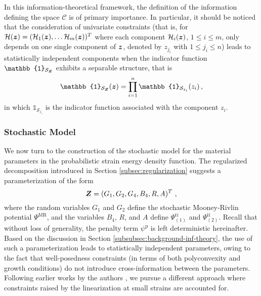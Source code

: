 In this information-theoretical framework, the definition of the information defining the space $\mathcal{C}$ is of primary importance. In particular, it should be noticed that the consideration of univariate constraints (that is, for $\mathcal{H}(\boldsymbol{z}) = (\mathcal{H}_1(\boldsymbol{z}), \ldots \mathcal{H}_m(\boldsymbol{z}))^T$ where each component $\mathcal{H}_i(\boldsymbol{z})$, $1 \leq i \leq m$, only depends on one single component of $\boldsymbol{z}$, denoted by $z_{j_i}$ with $1 \leq j_i \leq n$) leads to statistically independent components when the indicator function $\mathbb{1}_{\mathcal{S}_{\bfZ}}$ exhibits a separable structure, that is
\begin{equation}
    \mathbb{1}_{\mathcal{S}_{\bfZ}}(\bfz) = \prod_{i = 1}^{n} \mathbb{1}_{\mathcal{S}_{z_i}}(z_i)\,,
\end{equation}
in which $\mathbb{1}_{\mathcal{S}_{z_i}}$ is the indicator function associated with the component $z_i$.

\subsubsection{Stochastic Model} \label{Stochastic Model Homogeneous}

We now turn to the construction of the stochastic model for the material parameters in the probabilistic strain energy density function. The regularized decomposition introduced in Section \ref{subsec:regularization} suggests a parameterization of the form
\begin{equation}
    \boldsymbol{Z} = (G_1, G_2, G_4, B_4, R, A)^T~,
\end{equation}
where the random variables $G_1$ and $G_2$ define the stochastic Mooney-Rivlin potential $\Psi^{\text{MR}}$, and the variables $B_4$, $R$, and $A$ define $\Psi_{(1)}^\text{ti}$ and $\Psi_{(2)}^\text{ti}$. Recall that without loss of generality, the penalty term $\psi^\text{p}$ is left deterministic hereinafter. Based on the discussion in Section \ref{subsubsec:background-inf-theory}, the use of such a parameterization leads to statistically independent parameters, owing to the fact that well-posedness constraints (in terms of both polyconvexity and growth conditions) do not introduce cross-information between the parameters. Following earlier works by the authors \cite{staber2015stochastic,Staber2017zamm,STABER201894,staber2019stochastic}, we pursue a different approach where constraints raised by the linearization at small strains are accounted for. 

